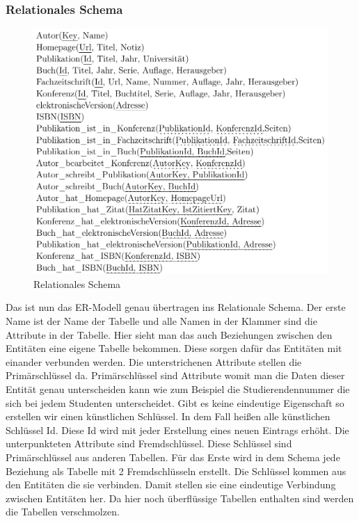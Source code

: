 \subsubsection{Relationales Schema}

\begin{figure}[!htb]
	\centering
	\includegraphics[width=12cm,keepaspectratio]{bilder/relationalesSchema}
	\caption{Relationales Schema}
	\label{fig:relationalesSchema}
\end{figure}

Das ist nun das ER-Modell genau übertragen ins Relationale Schema. Der erste Name ist der Name der Tabelle und alle Namen in der Klammer sind die Attribute in der Tabelle. Hier sieht man das auch Beziehungen zwischen den Entitäten eine eigene Tabelle bekommen. Diese sorgen dafür das Entitäten mit einander verbunden werden. Die unterstrichenen Attribute stellen die Primärschlüssel da. Primärschlüssel sind Attribute womit man die Daten dieser Entität genau unterscheiden kann wie zum Beispiel die Studierendennummer die sich bei jedem Studenten unterscheidet. Gibt es keine eindeutige Eigenschaft so erstellen wir einen künstlichen Schlüssel. In dem Fall heißen alle künstlichen Schlüssel Id. Diese Id wird mit jeder Erstellung eines neuen Eintrags erhöht. Die unterpunkteten Attribute sind Fremdschlüssel. Diese Schlüssel sind Primärschlüssel aus anderen Tabellen. Für das Erste wird in dem Schema jede Beziehung als Tabelle mit 2 Fremdschlüsseln erstellt. Die Schlüssel kommen aus den Entitäten die sie verbinden. Damit stellen sie eine eindeutige Verbindung zwischen Entitäten her. Da hier noch überflüssige Tabellen enthalten sind werden die Tabellen verschmolzen.

